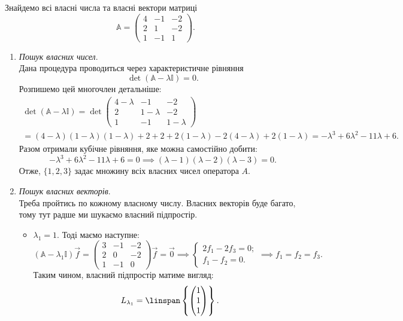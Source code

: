 \documentclass{math_library}
\begin{document}
\begin{example}
\label{find_eigenvectors}
Знайдемо всі власні числа та власні вектори матриці
\[
\mathbb{A} = \begin{pmatrix}
4 & -1 & -2 \\
2 & 1 & -2 \\
1 & -1 & 1
\end{pmatrix}.
\]
\begin{enumerate}[wide=0pt,label={\Roman*.}]
\item \textit{Пошук власних чисел}. \\
Дана процедура проводиться через характеристичне рівняння
\[
\det (\mathbb{A} - \lambda \mathbb{I}) = 0.
\]
Розпишемо цей многочлен детальніше:
\begin{multline*}
\det (\mathbb{A} - \lambda \mathbb{I}) = \det \begin{pmatrix}
4-\lambda & -1 & -2 \\
2 & 1-\lambda & -2 \\
1 & -1 & 1-\lambda
\end{pmatrix} \\
= (4-\lambda)(1-\lambda)(1-\lambda) + 2 + 2 + 2(1-\lambda) -2(4-\lambda) +2(1-\lambda) = -\lambda^3 + 6 \lambda^2 - 11 \lambda + 6.
\end{multline*}
Разом отримали кубічне рівняння, яке можна самостійно добити:
\[
-\lambda^3 + 6 \lambda^2 - 11 \lambda + 6 = 0 \implies (\lambda - 1)(\lambda -2)(\lambda - 3) = 0.
\]
Отже, $\{1,2,3\}$ задає множину всіх власних чисел оператора $A$.

\item \textit{Пошук власних векторів}.\\
Треба пройтись по кожному власному числу. Власних векторів буде багато, тому тут радше ми шукаємо власний підпростір.
\begin{itemize}[wide=0pt]
\item $\lambda_1 = 1$.
Тоді маємо наступне:
\[
(\mathbb{A} - \lambda_1 \mathbb{I})\vec{f} =\begin{pmatrix}
3 & -1 & -2 \\
2 & 0 & -2 \\
1 & -1 & 0
\end{pmatrix} \vec{f} = \vec{0} \implies \begin{cases} 2f_1 - 2f_3 = 0; \\ f_1 - f_2 = 0. \end{cases} \implies f_1 = f_2 = f_3. 
\]
Таким чином, власний підпростір матиме вигляд: 
\[
L_{\lambda_1} = \linspan\left\{ \begin{pmatrix}
1 \\ 1 \\ 1
\end{pmatrix} \right\}.
\]


\end{itemize}
\end{enumerate}
\end{example}
\end{document}
